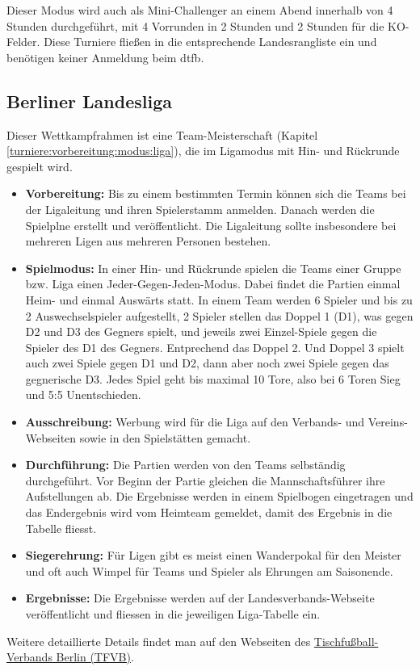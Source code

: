 Dieser Modus wird auch als Mini-Challenger an einem Abend innerhalb von 4 Stunden durchgeführt, mit 4 Vorrunden in 2 Stunden und 2 Stunden für die KO-Felder. Diese Turniere fließen in die entsprechende Landesrangliste ein und benötigen keiner Anmeldung beim \gls{dtfb}. 


\subsection{Berliner Landesliga}
\label{turniere:beispiele:landesliga}

Dieser Wettkampfrahmen ist eine Team-Meisterschaft (Kapitel \ref{turniere:vorbereitung:modus:liga}), die im Ligamodus mit Hin- und Rückrunde gespielt wird.

\begin{itemize}
\item \textbf{Vorbereitung:} Bis zu einem bestimmten Termin können sich die Teams bei der Ligaleitung und ihren Spielerstamm anmelden. Danach werden die Spielplne erstellt und veröffentlicht. Die Ligaleitung sollte insbesondere bei mehreren Ligen aus mehreren Personen bestehen. 
\item \textbf{Spielmodus:} In einer Hin- und Rückrunde spielen die Teams einer Gruppe bzw. Liga einen Jeder-Gegen-Jeden-Modus. Dabei findet die Partien einmal Heim- und einmal Auswärts statt.
In einem Team werden 6 Spieler und bis zu 2 Auswechselspieler aufgestellt, 2 Spieler stellen das Doppel 1 (D1), was gegen D2 und D3 des Gegners spielt, und jeweils zwei Einzel-Spiele gegen die Spieler des D1 des Gegners. Entprechend das Doppel 2. Und Doppel 3 spielt auch zwei Spiele gegen D1 und D2, dann aber noch zwei Spiele gegen das gegnerische D3.
Jedes Spiel geht bis maximal 10 Tore, also bei 6 Toren Sieg und 5:5 Unentschieden.
\item \textbf{Ausschreibung:} Werbung wird für die Liga auf den Verbands- und Vereins-Webseiten sowie in den Spielstätten gemacht.
\item \textbf{Durchführung:} Die Partien werden von den Teams selbständig durchgeführt. Vor Beginn der Partie gleichen die Mannschaftsführer ihre Aufstellungen ab. Die Ergebnisse werden in einem Spielbogen eingetragen und das Endergebnis wird vom Heimteam gemeldet, damit des Ergebnis in die Tabelle fliesst. 
\item \textbf{Siegerehrung:} Für Ligen gibt es meist einen Wanderpokal für den Meister und oft auch Wimpel für Teams und Spieler als Ehrungen  am Saisonende.
\item \textbf{Ergebnisse:} Die Ergebnisse werden auf der Landesverbands-Webseite veröffentlicht und fliessen in die jeweiligen Liga-Tabelle ein.
\end{itemize}
Weitere detaillierte Details findet man auf den Webseiten des \href{http://www.tfvb.de/attachments/offiziell/20160123_Spielordnung.pdf}{Tischfußball-Verbands Berlin (TFVB)}.